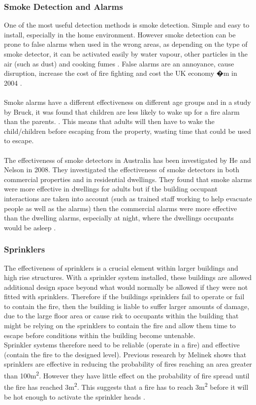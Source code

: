 \documentclass[table,a4paper,oneside]{book}
\begin{document}
\subsubsection{Smoke Detection and Alarms}
One of the most useful detection methods is smoke detection. Simple and easy to install, especially in the home environment. However smoke detection can be prone to false alarms when used in the wrong areas, as depending on the type of smoke detector, it can be activated easily by water vapour, other particles in the air (such as dust) and cooking fumes \citep{XieQiyuan07012004}. False alarms are an annoyance, cause disruption, increase the cost of fire fighting and cost the UK economy �m in 2004 \citep{TheDeputyPrimeMinister2006}.
\\
\\
Smoke alarms have a different effectiveness on different age groups and in a study by Bruck, it was found that children are less likely to wake up for a fire alarm than the parents. \citep{Bruck1999369}. This means that adults will then have to wake the child/children before escaping from the property, wasting time that could be used to escape.
\\
\\
The effectiveness of smoke detectors in Australia has been investigated by He and Nelson in 2008. They investigated the effectiveness of smoke detectors in both commercial properties and in residential dwellings. They found that smoke alarms were more effective in dwellings for adults but if the building occupant interactions are taken into account (such as trained staff working to help evacuate people as well as the alarms) then the commercial alarms were more effective than the dwelling alarms, especially at night, where the dwellings occupants would be asleep \citep{He2008}.
\subsubsection{Sprinklers}
The effectiveness of sprinklers is a crucial element within larger buildings and high rise structures. With a sprinkler system installed, these buildings are allowed additional design space beyond what would normally be allowed if they were not fitted with sprinklers. Therefore if the buildings sprinklers fail to operate or fail to contain the fire, then the building is liable to suffer larger amounts of damage, due to the large floor area or cause risk to occupants within the building that might be relying on the sprinklers to contain the fire and allow them time to escape before conditions within the building become untenable.
\\
Sprinkler systems therefore need to be reliable (operate in a fire) and effective (contain the fire to the designed level). Previous research by Melinek shows that sprinklers are effective in reducing the probability of fires reaching an area greater than 100m\textsuperscript{2}. However they have little effect on the probability of fire spread until the fire has reached 3m\textsuperscript{2}. This suggests that a fire has to reach 3m\textsuperscript{2} before it will be hot enough to activate the sprinkler heads \citep{Melinek1993299}.
\end{document}
